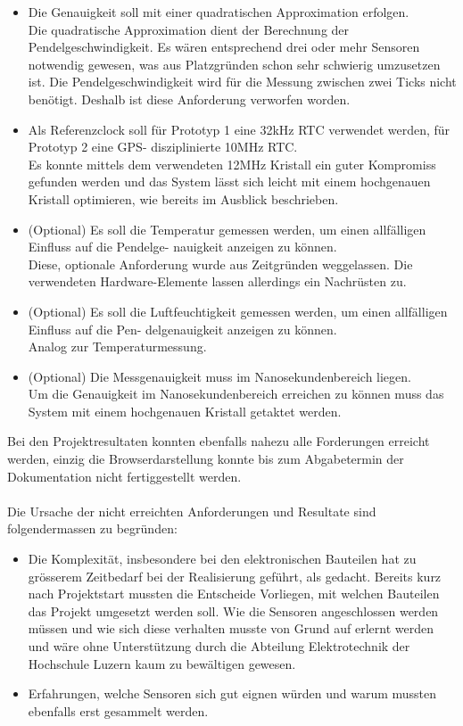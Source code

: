 \begin{itemize}
	\item Die Genauigkeit soll mit einer quadratischen Approximation erfolgen.\\
	Die quadratische Approximation dient der Berechnung der Pendelgeschwindigkeit. Es wären entsprechend drei oder mehr Sensoren notwendig gewesen, was aus Platzgründen schon sehr schwierig umzusetzen ist. Die Pendelgeschwindigkeit wird für die Messung zwischen zwei Ticks nicht benötigt. Deshalb ist diese Anforderung verworfen worden.
	\item Als Referenzclock soll für Prototyp 1 eine 32kHz RTC verwendet werden, für Prototyp 2 eine GPS-
disziplinierte 10MHz RTC.\\
	Es konnte mittels dem verwendeten 12MHz Kristall ein guter Kompromiss gefunden werden und das System lässt sich leicht mit einem hochgenauen Kristall optimieren, wie bereits im Ausblick beschrieben.
	\item (Optional) Es soll die Temperatur gemessen werden, um einen allfälligen Einfluss auf die Pendelge-
nauigkeit anzeigen zu können.\\
	Diese, optionale Anforderung wurde aus Zeitgründen weggelassen. Die verwendeten Hardware-Elemente lassen allerdings ein Nachrüsten zu.
	\item (Optional) Es soll die Luftfeuchtigkeit gemessen werden, um einen allfälligen Einfluss auf die Pen-
delgenauigkeit anzeigen zu können.\\
Analog zur Temperaturmessung.
	\item (Optional) Die Messgenauigkeit muss im Nanosekundenbereich liegen.\\
	Um die Genauigkeit im Nanosekundenbereich erreichen zu können muss das System mit einem hochgenauen Kristall getaktet werden.
\end{itemize}
Bei den Projektresultaten konnten ebenfalls nahezu alle Forderungen erreicht werden, einzig die Browserdarstellung konnte bis zum Abgabetermin der Dokumentation nicht fertiggestellt werden.\\
\\
Die Ursache der nicht erreichten Anforderungen und Resultate sind folgendermassen zu begründen:
\begin{itemize}
	\item Die Komplexität, insbesondere bei den elektronischen Bauteilen hat zu grösserem Zeitbedarf bei der Realisierung geführt, als gedacht. Bereits kurz nach Projektstart mussten die Entscheide Vorliegen, mit welchen Bauteilen das Projekt umgesetzt werden soll. Wie die Sensoren angeschlossen werden müssen und wie sich diese verhalten musste von Grund auf erlernt werden und wäre ohne Unterstützung durch die Abteilung Elektrotechnik der Hochschule Luzern kaum zu bewältigen gewesen.
	\item Erfahrungen, welche Sensoren sich gut eignen würden und warum mussten ebenfalls erst gesammelt werden.
\end{itemize}

